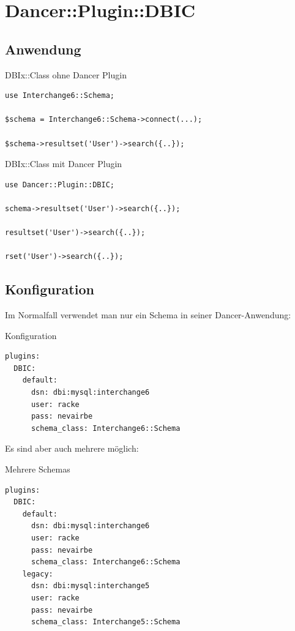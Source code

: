 \section{Dancer::Plugin::DBIC}
\subsection{Anwendung}
\begin{frame}[fragile]{DBIx::Class ohne Dancer Plugin}
\begin{lstlisting}
use Interchange6::Schema;

$schema = Interchange6::Schema->connect(...);

$schema->resultset('User')->search({..});
\end{lstlisting}
\end{frame}

\begin{frame}[fragile]{DBIx::Class mit Dancer Plugin}
\begin{lstlisting}
use Dancer::Plugin::DBIC;

schema->resultset('User')->search({..});

resultset('User')->search({..});

rset('User')->search({..});
\end{lstlisting}
\end{frame}

\subsection{Konfiguration}

Im Normalfall verwendet man nur ein Schema in seiner
Dancer-Anwendung:

\begin{frame}[fragile]{Konfiguration}
\begin{lstlisting}
plugins:
  DBIC:
    default:
      dsn: dbi:mysql:interchange6
      user: racke
      pass: nevairbe
      schema_class: Interchange6::Schema
\end{lstlisting}
\end{frame}

Es sind aber auch mehrere möglich:

\begin{frame}[fragile]{Mehrere Schemas}
\begin{lstlisting}
plugins:
  DBIC:
    default:
      dsn: dbi:mysql:interchange6
      user: racke
      pass: nevairbe
      schema_class: Interchange6::Schema
    legacy:
      dsn: dbi:mysql:interchange5
      user: racke
      pass: nevairbe
      schema_class: Interchange5::Schema
\end{lstlisting}
\end{frame}

